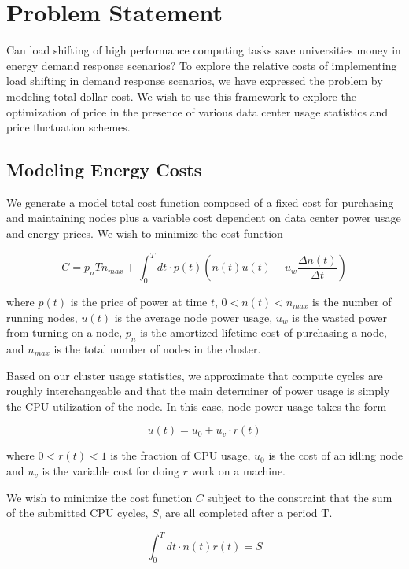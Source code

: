 \section{Problem Statement}

Can load shifting of high performance computing tasks save universities money in energy demand response scenarios?  To explore the relative costs of implementing load shifting in demand response scenarios, we have expressed the problem by modeling total dollar cost.  We wish to use this framework to explore the optimization of price in the presence of various data center usage statistics and price fluctuation schemes.

\subsection{Modeling Energy Costs}

We generate a model total cost function composed of a fixed cost for purchasing and maintaining nodes plus a variable cost dependent on data center power usage and energy prices.  We wish to minimize the cost function

$$C = p_n T n_{max} + \int_0^T dt \cdot p(t)\left (n(t)u(t)+ u_w \frac{\Delta n(t) }{\Delta t} \right )  $$

where $p(t)$ is the price of power at time $t$, $0<n(t)<n_{max}$ is the number of running nodes, $u(t)$ is the average node power usage, $u_w$ is the wasted power from turning on a node, $p_n$ is the amortized lifetime cost of purchasing a node, and $n_{max}$ is the total number of nodes in the cluster.  

Based on our cluster usage statistics, we approximate that compute cycles are roughly interchangeable and that the main determiner of power usage is simply the CPU utilization of the node. In this case, node power usage takes the form

$$u(t) = u_0 + u_v \cdot r(t)$$

where $0<r(t)<1$ is the fraction of CPU usage, $u_0$ is the cost of an idling node and $u_v$ is the variable cost for doing $r$ work on a machine.

We wish to minimize the cost function $C$ subject to the constraint that the sum of the submitted CPU cycles, $S$, are all completed after a period T.

$$\int_0^T dt \cdot n(t)r(t) = S$$

